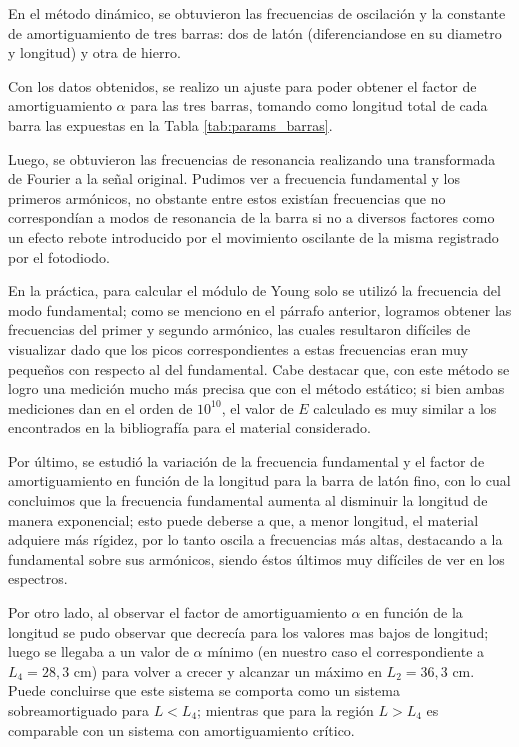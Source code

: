 \documentclass[twoside,twocolumn,a4paper]{article}
\begin{document}
En el m\'etodo din\'amico, se obtuvieron las frecuencias de oscilaci\'on y la constante de amortiguamiento de tres barras: dos de lat\'on (diferenciandose en su diametro y longitud) y otra de hierro. 

Con los datos obtenidos, se realizo un ajuste para poder obtener el factor de amortiguamiento $\alpha$ para las tres barras, tomando como longitud total de cada barra las expuestas en la Tabla \ref{tab:params_barras}.

Luego, se obtuvieron las frecuencias de resonancia realizando una transformada de Fourier a la se\~nal original. Pudimos ver a frecuencia fundamental y los primeros arm\'onicos, no obstante entre estos exist\'ian frecuencias que no correspond\'ian a modos de resonancia de la barra si no a diversos factores como un efecto rebote introducido por el movimiento oscilante de la misma registrado por el fotodiodo. \newline

En la pr\'actica, para calcular el m\'odulo de Young solo se utiliz\'o la frecuencia del modo fundamental; como se menciono en el p\'arrafo anterior, logramos obtener las frecuencias del primer y segundo arm\'onico, las cuales resultaron dif\'iciles de visualizar dado que los picos correspondientes a estas frecuencias eran muy peque\~nos con respecto al del fundamental. Cabe destacar que, con este m\'etodo se logro una medici\'on mucho m\'as precisa que con el m\'etodo est\'atico; si bien ambas mediciones dan en el orden de $10^{10}$, el valor de $E$ calculado es muy similar a los encontrados en la bibliograf\'ia para el material considerado.\newline

Por \'ultimo, se estudi\'o la variaci\'on de la frecuencia fundamental y el factor de amortiguamiento en funci\'on de la longitud para la barra de lat\'on fino, con lo cual concluimos que
la frecuencia fundamental aumenta al disminuir la longitud de manera exponencial; esto puede deberse a que, a menor longitud, el material adquiere m\'as r\'igidez, por lo tanto oscila a frecuencias m\'as altas, destacando a la fundamental sobre sus arm\'onicos, siendo \'estos \'ultimos muy dif\'iciles de ver en los espectros. \newline

Por otro lado, al observar el factor de amortiguamiento $\alpha$ en funci\'on de la longitud se pudo observar que decrec\'ia para los valores mas bajos de longitud; luego se llegaba a un valor de $\alpha$ m\'inimo (en nuestro caso el correspondiente a $L_{4} = 28,3$ cm) para volver a crecer y alcanzar un m\'aximo en $L_{2} = 36,3$ cm. Puede concluirse que este sistema se comporta como un sistema sobreamortiguado para $L < L_{4}$; mientras que para la regi\'on $L > L_{4}$ es comparable con un sistema con amortiguamiento cr\'itico. 
\end{document}
